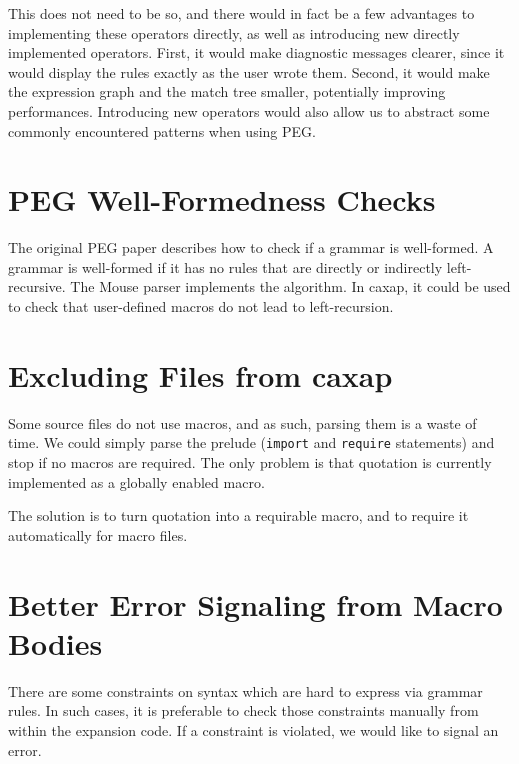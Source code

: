 This does not need to be so, and there would in fact be a few advantages to
implementing these operators directly, as well as introducing new directly
implemented operators. First, it would make diagnostic messages clearer, since
it would display the rules exactly as the user wrote them. Second, it would make
the expression graph and the match tree smaller, potentially improving
performances. Introducing new operators would also allow us to abstract some
commonly encountered patterns when using PEG.

\section{PEG Well-Formedness Checks}

The original PEG paper \cite{ford2004} describes how to check if a grammar is
well-formed. A grammar is well-formed if it has no rules that are directly or
indirectly left-recursive. The Mouse parser \cite{redziejowski2009} implements
the algorithm. In caxap, it could be used to check that user-defined macros do
not lead to left-recursion.

\section{Excluding Files from caxap}

Some source files do not use macros, and as such, parsing them is a waste of
time. We could simply parse the prelude (\texttt{import} and \texttt{require}
statements) and stop if no macros are required. The only problem is that
quotation is currently implemented as a globally enabled macro.

The solution is to turn quotation into a requirable macro, and to require it
automatically for macro files.

\section{Better Error Signaling from Macro Bodies}

There are some constraints on syntax which are hard to express via grammar
rules. In such cases, it is preferable to check those constraints manually from
within the expansion code. If a constraint is violated, we would like to signal
an error.

